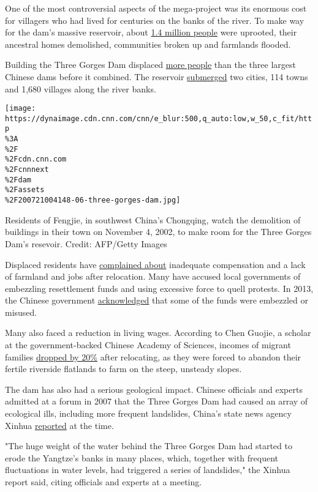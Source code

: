 One of the most controversial aspects of the mega-project was its
enormous cost for villagers who had lived for centuries on the banks of
the river. To make way for the dam's massive reservoir, about
\href{http://www.china.com.cn/economic/txt/2010-01/22/content_19289419.htm}{1.4
million people} were uprooted, their ancestral homes demolished,
communities broken up and farmlands flooded.

Building the Three Gorges Dam displaced
\href{https://online.ucpress.edu/cpcs/article/33/2/223/455/Resettlement-for-China-s-Three-Gorges-Dam-socio}{more
people} than the three largest Chinese dams before it combined. The
reservoir
\href{http://www.gov.cn/ztzl/2006-01/02/content_145309.htm}{submerged}
two cities, 114 towns and 1,680 villages along the river banks.

\texttt{[image: https://dynaimage.cdn.cnn.com/cnn/e\_blur:500,q\_auto:low,w\_50,c\_fit/http\\\%3A\\\%2F\\\%2Fcdn.cnn.com\\\%2Fcnnnext\\\%2Fdam\\\%2Fassets\\\%2F200721004148-06-three-gorges-dam.jpg]}

Residents of Fengjie, in southwest China's Chongqing, watch the
demolition of buildings in their town on November 4, 2002, to make room
for the Three Gorges Dam's resevoir. Credit: AFP/Getty Images

Displaced residents have
\href{https://www.internationalrivers.org/sites/default/files/attached-files/3gcolor.pdf}{complained
about} inadequate compensation and a lack of farmland and jobs after
relocation. Many have accused local governments of embezzling
resettlement funds and using excessive force to quell protests. In 2013,
the Chinese government
\href{http://www.gov.cn/jrzg/2013-06/07/content_2421831.htm}{acknowledged}
that some of the funds were embezzled or misused.

Many also faced a reduction in living wages. According to Chen Guojie, a
scholar at the government-backed Chinese Academy of Sciences, incomes of
migrant families
\href{http://3gd.ced.berkeley.edu/docs/3GD_Summary.pdf}{dropped by 20\%}
after relocating, as they were forced to abandon their fertile riverside
flatlands to farm on the steep, unsteady slopes.

The dam has also had a serious geological impact. Chinese officials and
experts admitted at a forum in 2007 that the Three Gorges Dam had caused
an array of ecological ills, including more frequent landslides, China's
state news agency Xinhua
\href{https://www.chinadaily.com.cn/china/2007-09/26/content_6137027.htm}{reported}
at the time.

"The huge weight of the water behind the Three Gorges Dam had started to
erode the Yangtze's banks in many places, which, together with frequent
fluctuations in water levels, had triggered a series of landslides," the
Xinhua report said, citing officials and experts at a meeting.

